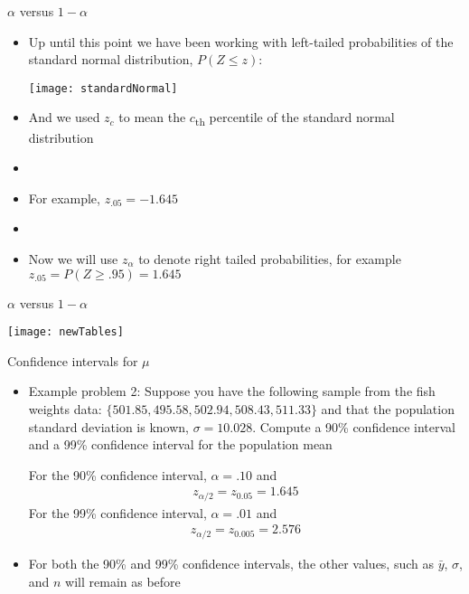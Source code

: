 \documentclass[xcolor=dvipsnames]{beamer}
\begin{document}
\begin{frame}{$\alpha$ versus $1-\alpha$}
	\begin{itemize}
		\item Up until this point we have been working with left-tailed probabilities of the standard normal distribution, $P(Z \leq z)$:
		\begin{center}
			\texttt{[image: standardNormal]}
		\end{center}  \pause
		\item And we used $z_c$ to mean the $c$\textsubscript{th} percentile of the standard normal distribution  \pause
		\item[]
		\item For example, $z_{.05} = -1.645$  \pause
		\item[]
		\item Now we will use $z_{\alpha}$ to denote right tailed probabilities, for example $z_{.05}=P(Z\geq .95) = 1.645$
	\end{itemize}
\end{frame}

\begin{frame}{$\alpha$ versus $1-\alpha$}
	\begin{center}
		\texttt{[image: newTables]}
	\end{center}
\end{frame}

\begin{frame}{Confidence intervals for $\mu$}
	\begin{itemize}
		\item Example problem 2: Suppose you have the following sample from the fish weights data: $\{501.85, 495.58, 502.94, 508.43, 511.33 \}$ and that the population standard deviation is known, $\sigma = 10.028$. Compute a 90\% confidence interval and a 99\% confidence interval for the population mean\\  \vspace{10pt}  \pause
		
		For the 90\% confidence interval, $\alpha = .10$ and 
		\begin{gather*}
			z_{\alpha / 2} = z_{0.05} = 1.645
		\end{gather*} \pause
		For the 99\% confidence interval, $\alpha = .01$ and 
		\begin{gather*}
		z_{\alpha / 2} = z_{0.005} = 2.576
		\end{gather*}  \pause
		
		\item For both the 90\% and 99\% confidence intervals, the other values, such as $\bar{y}$, $\sigma$, and $n$ will remain as before
	\end{itemize}
\end{frame}
\end{document}
